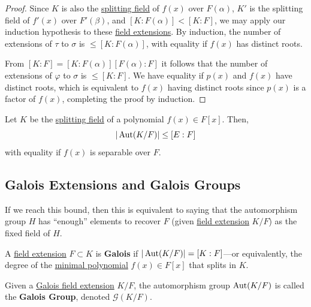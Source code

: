 \begin{proof}
    Since $K$ is also the \hyperref[def:splitting-field]{splitting field} of $f(x)$ over $F(\alpha)$, $K'$ is the splitting field of $f'(x)$ over $F'(\beta)$, and $[K : F(\alpha)] < [K : F]$, we may apply our induction hypothesis to these \hyperref[def:field-extension]{field extensions}. By induction, the number of extensions of $\tau$ to $\sigma$ is $\leq [K : F(\alpha)]$, with equality if $f(x)$ has distinct roots.

    From $[K : F] = [K : F(\alpha)][F(\alpha) : F]$ it follows that the number of extensions of $\varphi$ to $\sigma$ is $\leq [K : F]$. We have equality if $p(x)$ and $f(x)$ have distinct roots, which is equivalent to $f(x)$ having distinct roots since $p(x)$ is a factor of $f(x)$, completing the proof by induction. 
  \end{proof}

  \begin{corollary}
    \label{thm:bound-on-order-of-automorphism-group}
    Let $K$ be the \hyperref[def:splitting-field]{splitting field} of a polynomial $f(x) \in F[x]$. Then, 
    \begin{equation}
      | \operatorname{Aut}(K/F) | \leq [E:F]
    \end{equation}
    with equality if $f(x)$ is separable over $F$. 
  \end{corollary}

\subsection{Galois Extensions and Galois Groups}

  If we reach this bound, then this is equivalent to saying that the automorphism group $H$ has ``enough'' elements to recover $F$ (given \hyperref[def:field-extension]{field extension} $K/F$) as the fixed field of $H$. 

  \begin{definition}
    \label{def:galois-field-extension}
    A \hyperref[def:field-extension]{field extension} $F \subset K$ is \textbf{Galois} if $|\operatorname{Aut}(K/F)| = [K:F]$---or equivalently, the degree of the \hyperref[def:min_poly]{minimal polynomial} $f(x) \in F[x]$ that splits in $K$. 
  \end{definition}

  \begin{definition}
    \label{def:galois-group-of-galois-field-extension}
    Given a \hyperref[def:galois-field-extension]{Galois field extension} $K/F$, the automorphism group $\operatorname{Aut}(K/F)$ is called the \textbf{Galois Group}, denoted $\mathcal{G}(K/F)$. 
  \end{definition}

